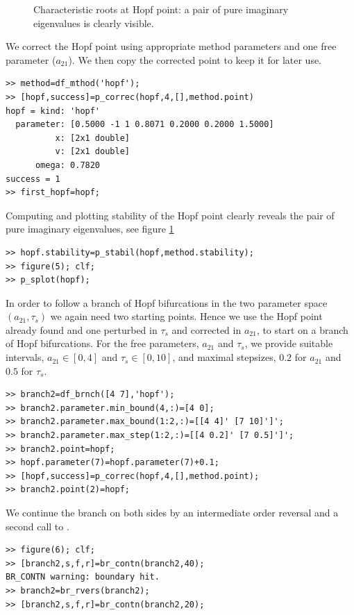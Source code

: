 \documentclass[10pt]{article}
\gdef \file#1{{\bfseries{\ttfamily{#1}}}}
\begin{document}
{\begin{figure}[h]
\begin{center}
\end{center}
\caption{\small\label{ride5_pic}Characteristic roots at Hopf
point: a pair of pure imaginary eigenvalues is clearly visible.} 
\end{figure}
We correct the Hopf point using appropriate method parameters
and one free parameter ($a_{21}$). We then copy the corrected point
to keep it for later use.
{\small\begin{verbatim}
>> method=df_mthod('hopf');
>> [hopf,success]=p_correc(hopf,4,[],method.point)
hopf = kind: 'hopf'
  parameter: [0.5000 -1 1 0.8071 0.2000 0.2000 1.5000]
          x: [2x1 double]
          v: [2x1 double]
      omega: 0.7820
success = 1
>> first_hopf=hopf;
\end{verbatim}}
Computing and plotting stability of the Hopf point clearly reveals the pair of pure
imaginary eigenvalues, see figure \ref{ride5_pic} 
{\small\begin{verbatim}
>> hopf.stability=p_stabil(hopf,method.stability);
>> figure(5); clf;
>> p_splot(hopf);
\end{verbatim}}
In order to follow a branch of Hopf bifurcations in the two parameter
space $(a_{21},\tau_s)$ we again need two starting points.
Hence we use the Hopf point already found and one perturbed in $\tau_s$
and corrected in $a_{21}$, to start on a branch
of Hopf bifurcations.
For the free parameters, $a_{21}$ and $\tau_s$, 
we provide suitable intervals, 
$a_{21}\in[0,4]$ and $\tau_s\in[0,10]$, and maximal stepsizes,
$0.2$ for $a_{21}$ and $0.5$ for $\tau_s$.
{\small\begin{verbatim}
>> branch2=df_brnch([4 7],'hopf');
>> branch2.parameter.min_bound(4,:)=[4 0];
>> branch2.parameter.max_bound(1:2,:)=[[4 4]' [7 10]']';
>> branch2.parameter.max_step(1:2,:)=[[4 0.2]' [7 0.5]']';
>> branch2.point=hopf;
>> hopf.parameter(7)=hopf.parameter(7)+0.1;
>> [hopf,success]=p_correc(hopf,4,[],method.point);
>> branch2.point(2)=hopf;
\end{verbatim}}
We continue the branch on both sides by an intermediate order
reversal and a second call to \file{br\_contn}.
{\small\begin{verbatim}
>> figure(6); clf;
>> [branch2,s,f,r]=br_contn(branch2,40);
BR_CONTN warning: boundary hit.
>> branch2=br_rvers(branch2);
>> [branch2,s,f,r]=br_contn(branch2,20);
\end{verbatim}}
\begin{figure}[h]
\begin{center}

\end{center}
\end{figure}}
\end{document}
